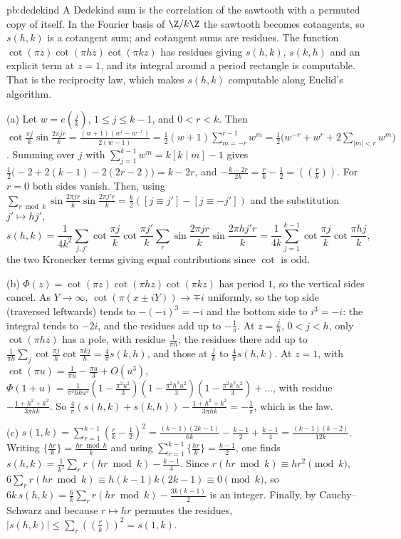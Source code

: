\begin{solution}{pb:dedekind}
\idea A Dedekind sum is the correlation of the sawtooth with a permuted copy of itself. In the Fourier basis of $\Z/k\Z$ the sawtooth becomes cotangents, so $s(h,k)$ is a cotangent
sum; and cotangent sums are residues. The function $\cot(\pi z)\cot(\pi hz)\cot(\pi kz)$ has residues giving $s(h,k)$, $s(k,h)$ and an explicit term at $z=1$, and its integral around a
period rectangle is computable. That is the reciprocity law, which makes $s(h,k)$ computable along Euclid's algorithm.

\writeup (a) Let $w=e(\frac jk)$, $1\le j\le k-1$, and $0<r<k$. Then $\cot\frac{\pi j}k\sin\frac{2\pi jr}k=\frac{(w+1)(w^r-w^{-r})}{2(w-1)}=\frac12(w+1)\sum_{m=-r}^{r-1}w^m=\frac12\bigl(w^{-r}+w^r+2\sum_{|m|<r}w^m\bigr)$.
Summing over $j$ with $\sum_{j=1}^{k-1}w^m=k[k\mid m]-1$ gives $\frac12\bigl(-2+2(k-1)-2(2r-2)\bigr)=k-2r$, and $-\frac{k-2r}{2k}=\frac rk-\frac12=((\frac rk))$. For $r=0$ both sides vanish.
Then, using $\sum_{r\bmod k}\sin\frac{2\pi jr}k\sin\frac{2\pi j'r}k=\frac k2([j\equiv j']-[j\equiv-j'])$ and the substitution $j'\mapsto hj'$,
\[
s(h,k)=\frac1{4k^2}\sum_{j,j'}\cot\frac{\pi j}k\cot\frac{\pi j'}k\sum_r\sin\frac{2\pi jr}k\sin\frac{2\pi hj'r}k=\frac1{4k}\sum_{j=1}^{k-1}\cot\frac{\pi j}k\cot\frac{\pi hj}k,
\]
the two Kronecker terms giving equal contributions since $\cot$ is odd.

(b) $\Phi(z)=\cot(\pi z)\cot(\pi hz)\cot(\pi kz)$ has period $1$, so the vertical sides cancel. As $Y\to\infty$, $\cot(\pi(x\pm iY))\to\mp i$ uniformly, so the top side (traversed
leftwards) tends to $-(-i)^3=-i$ and the bottom side to $i^3=-i$: the integral tends to $-2i$, and the residues add up to $-\frac1\pi$. At $z=\frac jh$, $0<j<h$, only $\cot(\pi hz)$ has
a pole, with residue $\frac1{\pi h}$; the residues there add up to $\frac1{\pi h}\sum_j\cot\frac{\pi j}h\cot\frac{\pi kj}h=\frac4\pi s(k,h)$, and those at $\frac jk$ to $\frac4\pi s(h,k)$. At $z=1$,
with $\cot(\pi u)=\frac1{\pi u}-\frac{\pi u}3+O(u^3)$, $\Phi(1+u)=\frac1{\pi^3hku^3}(1-\frac{\pi^2u^2}3)(1-\frac{\pi^2h^2u^2}3)(1-\frac{\pi^2k^2u^2}3)+\dots$, with residue
$-\frac{1+h^2+k^2}{3\pi hk}$. So $\frac4\pi(s(h,k)+s(k,h))-\frac{1+h^2+k^2}{3\pi hk}=-\frac1\pi$, which is the law.

(c) $s(1,k)=\sum_{r=1}^{k-1}(\frac rk-\frac12)^2=\frac{(k-1)(2k-1)}{6k}-\frac{k-1}2+\frac{k-1}4=\frac{(k-1)(k-2)}{12k}$. Writing $\{\frac{hr}k\}=\frac{hr\bmod k}k$ and using
$\sum_{r=1}^{k-1}\{\frac{hr}k\}=\frac{k-1}2$, one finds $s(h,k)=\frac1{k^2}\sum_rr\,(hr\bmod k)-\frac{k-1}4$. Since $r(hr\bmod k)\equiv hr^2\pmod k$, $6\sum_rr(hr\bmod k)\equiv h(k-1)k(2k-1)\equiv0\pmod k$,
so $6k\,s(h,k)=\frac6k\sum_rr(hr\bmod k)-\frac{3k(k-1)}2$ is an integer. Finally, by Cauchy--Schwarz and because $r\mapsto hr$ permutes the residues,
$|s(h,k)|\le\sum_r((\frac rk))^2=s(1,k)$.


\end{solution}
